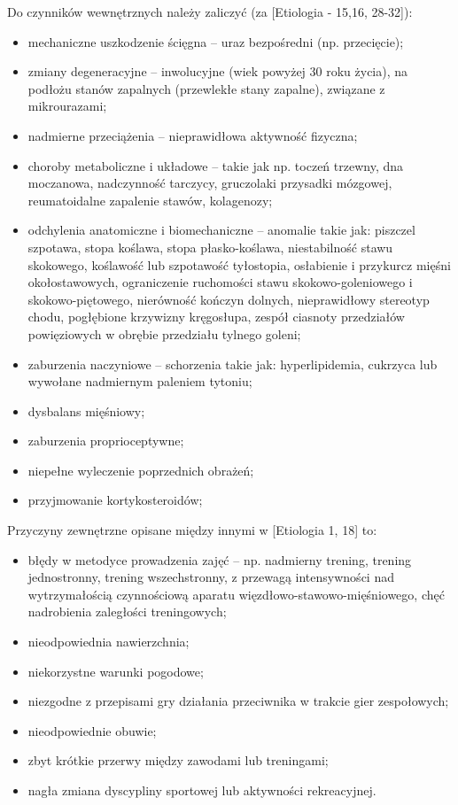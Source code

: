 Do czynników wewnętrznych należy zaliczyć (za [Etiologia - 15,16, 28-32]):
\begin{itemize}
	\item mechaniczne uszkodzenie ścięgna -- uraz bezpośredni (np. przecięcie);
	\item zmiany degeneracyjne -- inwolucyjne (wiek powyżej 30 roku życia), na podłożu stanów zapalnych (przewlekłe stany zapalne), związane z mikrourazami;
	\item nadmierne przeciążenia -- nieprawidłowa aktywność fizyczna;
	\item choroby metaboliczne i układowe -- takie jak np. toczeń trzewny, dna moczanowa, nadczynność tarczycy, gruczolaki przysadki mózgowej, reumatoidalne zapalenie stawów, kolagenozy;
	\item odchylenia anatomiczne i biomechaniczne -- anomalie takie jak: piszczel szpotawa, stopa koślawa, stopa płasko-koślawa, niestabilność stawu skokowego, koślawość lub szpotawość tyłostopia, osłabienie i przykurcz mięśni okołostawowych, ograniczenie ruchomości stawu skokowo-goleniowego i skokowo-piętowego, nierówność kończyn dolnych, nieprawidłowy stereotyp chodu, pogłębione krzywizny kręgosłupa, zespół ciasnoty przedziałów powięziowych w obrębie przedziału tylnego goleni;
	\item zaburzenia naczyniowe -- schorzenia takie jak: hyperlipidemia, cukrzyca lub wywołane nadmiernym paleniem tytoniu;
	\item dysbalans mięśniowy;
	\item zaburzenia proprioceptywne;
	\item niepełne wyleczenie poprzednich obrażeń;
	\item przyjmowanie kortykosteroidów;
\end{itemize}

Przyczyny zewnętrzne opisane między innymi w [Etiologia 1, 18] to:
\begin{itemize}
	\item błędy w metodyce prowadzenia zajęć -- np. nadmierny trening, trening jednostronny, trening wszechstronny, z przewagą intensywności nad wytrzymałością czynnościową aparatu więzdłowo-stawowo-mięśniowego, chęć nadrobienia zaległości treningowych;
	\item nieodpowiednia nawierzchnia;
	\item niekorzystne warunki pogodowe;
	\item niezgodne z przepisami gry działania przeciwnika w trakcie gier zespołowych;
	\item nieodpowiednie obuwie;
	\item zbyt krótkie przerwy między zawodami lub treningami;
	\item nagła zmiana dyscypliny sportowej lub aktywności rekreacyjnej.
\end{itemize}

